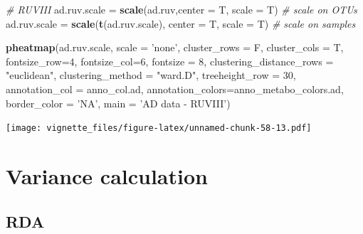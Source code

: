 \documentclass[]{book}
\newenvironment{Shaded}{\begin{snugshade}}{\end{snugshade}}
\newcommand{\KeywordTok}[1]{\textcolor[rgb]{0.13,0.29,0.53}{\textbf{#1}}}
\newcommand{\DataTypeTok}[1]{\textcolor[rgb]{0.13,0.29,0.53}{#1}}
\newcommand{\DecValTok}[1]{\textcolor[rgb]{0.00,0.00,0.81}{#1}}
\newcommand{\StringTok}[1]{\textcolor[rgb]{0.31,0.60,0.02}{#1}}
\newcommand{\CommentTok}[1]{\textcolor[rgb]{0.56,0.35,0.01}{\textit{#1}}}
\newcommand{\NormalTok}[1]{#1}
\begin{document}
\begin{Shaded}
\begin{Highlighting}[]
\CommentTok{# RUVIII}
\NormalTok{ad.ruv.scale =}\StringTok{ }\KeywordTok{scale}\NormalTok{(ad.ruv,}\DataTypeTok{center =}\NormalTok{ T, }\DataTypeTok{scale =}\NormalTok{ T) }\CommentTok{# scale on OTUs}
\NormalTok{ad.ruv.scale =}\StringTok{ }\KeywordTok{scale}\NormalTok{(}\KeywordTok{t}\NormalTok{(ad.ruv.scale), }\DataTypeTok{center =}\NormalTok{ T, }\DataTypeTok{scale =}\NormalTok{ T) }\CommentTok{# scale on samples}

\KeywordTok{pheatmap}\NormalTok{(ad.ruv.scale, }
         \DataTypeTok{scale =} \StringTok{'none'}\NormalTok{, }
         \DataTypeTok{cluster_rows =}\NormalTok{ F, }
         \DataTypeTok{cluster_cols =}\NormalTok{ T, }
         \DataTypeTok{fontsize_row=}\DecValTok{4}\NormalTok{, }\DataTypeTok{fontsize_col=}\DecValTok{6}\NormalTok{,}
         \DataTypeTok{fontsize =} \DecValTok{8}\NormalTok{,}
         \DataTypeTok{clustering_distance_rows =} \StringTok{"euclidean"}\NormalTok{,}
         \DataTypeTok{clustering_method =} \StringTok{"ward.D"}\NormalTok{,}
         \DataTypeTok{treeheight_row =} \DecValTok{30}\NormalTok{,}
         \DataTypeTok{annotation_col =}\NormalTok{ anno_col.ad,}
         \DataTypeTok{annotation_colors=}\NormalTok{anno_metabo_colors.ad,}
         \DataTypeTok{border_color =} \StringTok{'NA'}\NormalTok{,}
         \DataTypeTok{main =} \StringTok{'AD data - RUVIII'}\NormalTok{)}
\end{Highlighting}
\end{Shaded}

\texttt{[image: vignette\_files/figure-latex/unnamed-chunk-58-13.pdf]}

\section{Variance calculation}\label{variance-calculation}

\subsection{RDA}\label{rda}
\end{document}
